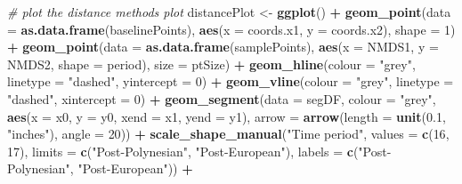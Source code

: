 \documentclass[nofonts,]{tufte-handout}
\newenvironment{Shaded}{\begin{snugshade}}{\end{snugshade}}
\newcommand{\AttributeTok}[1]{\textcolor[rgb]{0.13,0.29,0.53}{#1}}
\newcommand{\CommentTok}[1]{\textcolor[rgb]{0.56,0.35,0.01}{\textit{#1}}}
\newcommand{\DecValTok}[1]{\textcolor[rgb]{0.00,0.00,0.81}{#1}}
\newcommand{\FloatTok}[1]{\textcolor[rgb]{0.00,0.00,0.81}{#1}}
\newcommand{\FunctionTok}[1]{\textcolor[rgb]{0.13,0.29,0.53}{\textbf{#1}}}
\newcommand{\NormalTok}[1]{#1}
\newcommand{\OtherTok}[1]{\textcolor[rgb]{0.56,0.35,0.01}{#1}}
\newcommand{\SpecialCharTok}[1]{\textcolor[rgb]{0.81,0.36,0.00}{\textbf{#1}}}
\newcommand{\StringTok}[1]{\textcolor[rgb]{0.31,0.60,0.02}{#1}}
\begin{document}
\begin{Shaded}
\begin{Highlighting}[]
\CommentTok{\# plot the distance methods plot}
\NormalTok{distancePlot }\OtherTok{\textless{}{-}} \FunctionTok{ggplot}\NormalTok{() }\SpecialCharTok{+} 
  \FunctionTok{geom\_point}\NormalTok{(}\AttributeTok{data =} \FunctionTok{as.data.frame}\NormalTok{(baselinePoints),}
             \FunctionTok{aes}\NormalTok{(}\AttributeTok{x =}\NormalTok{ coords.x1, }\AttributeTok{y =}\NormalTok{ coords.x2),}
             \AttributeTok{shape =} \DecValTok{1}\NormalTok{) }\SpecialCharTok{+}
  \FunctionTok{geom\_point}\NormalTok{(}\AttributeTok{data =} \FunctionTok{as.data.frame}\NormalTok{(samplePoints),}
             \FunctionTok{aes}\NormalTok{(}\AttributeTok{x =}\NormalTok{ NMDS1, }\AttributeTok{y =}\NormalTok{ NMDS2,}
                 \AttributeTok{shape =}\NormalTok{ period),}
             \AttributeTok{size =}\NormalTok{ ptSize) }\SpecialCharTok{+}
  \FunctionTok{geom\_hline}\NormalTok{(}\AttributeTok{colour =} \StringTok{"grey"}\NormalTok{, }\AttributeTok{linetype =} \StringTok{"dashed"}\NormalTok{, }
             \AttributeTok{yintercept =} \DecValTok{0}\NormalTok{) }\SpecialCharTok{+}
  \FunctionTok{geom\_vline}\NormalTok{(}\AttributeTok{colour =} \StringTok{"grey"}\NormalTok{, }\AttributeTok{linetype =} \StringTok{"dashed"}\NormalTok{, }
             \AttributeTok{xintercept =} \DecValTok{0}\NormalTok{) }\SpecialCharTok{+}
  \FunctionTok{geom\_segment}\NormalTok{(}\AttributeTok{data =}\NormalTok{ segDF,}
               \AttributeTok{colour =} \StringTok{"grey"}\NormalTok{,}
               \FunctionTok{aes}\NormalTok{(}\AttributeTok{x =}\NormalTok{ x0, }\AttributeTok{y =}\NormalTok{ y0,}
                   \AttributeTok{xend =}\NormalTok{ x1, }\AttributeTok{yend =}\NormalTok{ y1),}
               \AttributeTok{arrow =} \FunctionTok{arrow}\NormalTok{(}\AttributeTok{length =} \FunctionTok{unit}\NormalTok{(}\FloatTok{0.1}\NormalTok{, }\StringTok{"inches"}\NormalTok{),}
                             \AttributeTok{angle =} \DecValTok{20}\NormalTok{)) }\SpecialCharTok{+}
    \FunctionTok{scale\_shape\_manual}\NormalTok{(}\StringTok{"Time period"}\NormalTok{, }
                       \AttributeTok{values =} \FunctionTok{c}\NormalTok{(}\DecValTok{16}\NormalTok{, }\DecValTok{17}\NormalTok{),}
                    \AttributeTok{limits =} \FunctionTok{c}\NormalTok{(}\StringTok{"Post{-}Polynesian"}\NormalTok{, }
                               \StringTok{"Post{-}European"}\NormalTok{),}
                    \AttributeTok{labels =} \FunctionTok{c}\NormalTok{(}\StringTok{"Post{-}Polynesian"}\NormalTok{, }
                               \StringTok{"Post{-}European"}\NormalTok{)) }\SpecialCharTok{+}

\end{Highlighting}
\end{Shaded}
\end{document}
